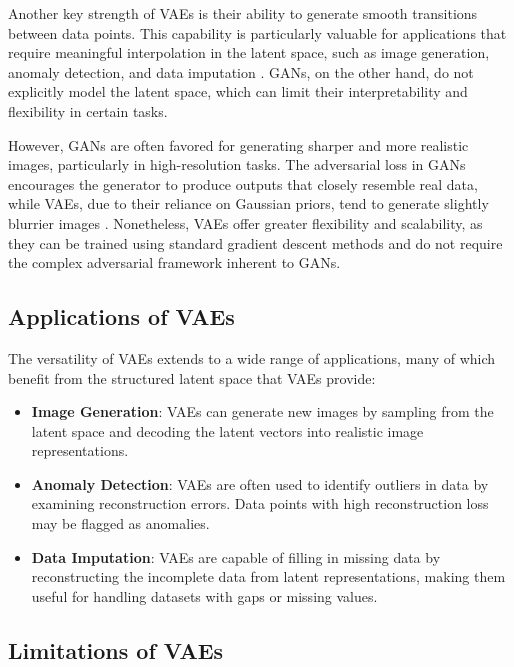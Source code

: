 Another key strength of VAEs is their ability to generate smooth transitions between data points. This capability is particularly valuable for applications that require meaningful interpolation in the latent space, such as image generation, anomaly detection, and data imputation \citep{10.1088/2632-2153/ab80b7}\citep{10.48550/arxiv.2002.10464}. GANs, on the other hand, do not explicitly model the latent space, which can limit their interpretability and flexibility in certain tasks.

However, GANs are often favored for generating sharper and more realistic images, particularly in high-resolution tasks. The adversarial loss in GANs encourages the generator to produce outputs that closely resemble real data, while VAEs, due to their reliance on Gaussian priors, tend to generate slightly blurrier images \citep{10.1109/access.2020.2977671}. Nonetheless, VAEs offer greater flexibility and scalability, as they can be trained using standard gradient descent methods and do not require the complex adversarial framework inherent to GANs.

\subsection{Applications of VAEs}

The versatility of VAEs extends to a wide range of applications, many of which benefit from the structured latent space that VAEs provide:
\begin{itemize}
    \item \textbf{Image Generation}: VAEs can generate new images by sampling from the latent space and decoding the latent vectors into realistic image representations.
    \item \textbf{Anomaly Detection}: VAEs are often used to identify outliers in data by examining reconstruction errors. Data points with high reconstruction loss may be flagged as anomalies.
    \item \textbf{Data Imputation}: VAEs are capable of filling in missing data by reconstructing the incomplete data from latent representations, making them useful for handling datasets with gaps or missing values.
\end{itemize}

\subsection{Limitations of VAEs}

